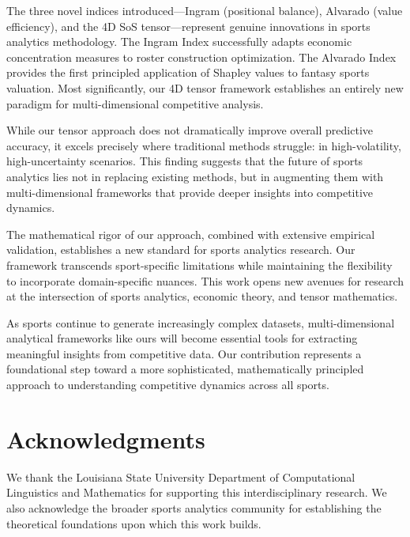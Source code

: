 \documentclass[11pt]{article}
\begin{document}
The three novel indices introduced—Ingram (positional balance), Alvarado (value efficiency), and the 4D SoS tensor—represent genuine innovations in sports analytics methodology. The Ingram Index successfully adapts economic concentration measures to roster construction optimization. The Alvarado Index provides the first principled application of Shapley values to fantasy sports valuation. Most significantly, our 4D tensor framework establishes an entirely new paradigm for multi-dimensional competitive analysis.

While our tensor approach does not dramatically improve overall predictive accuracy, it excels precisely where traditional methods struggle: in high-volatility, high-uncertainty scenarios. This finding suggests that the future of sports analytics lies not in replacing existing methods, but in augmenting them with multi-dimensional frameworks that provide deeper insights into competitive dynamics.

The mathematical rigor of our approach, combined with extensive empirical validation, establishes a new standard for sports analytics research. Our framework transcends sport-specific limitations while maintaining the flexibility to incorporate domain-specific nuances. This work opens new avenues for research at the intersection of sports analytics, economic theory, and tensor mathematics.

As sports continue to generate increasingly complex datasets, multi-dimensional analytical frameworks like ours will become essential tools for extracting meaningful insights from competitive data. Our contribution represents a foundational step toward a more sophisticated, mathematically principled approach to understanding competitive dynamics across all sports.

\section*{Acknowledgments}

We thank the Louisiana State University Department of Computational Linguistics and Mathematics for supporting this interdisciplinary research. We also acknowledge the broader sports analytics community for establishing the theoretical foundations upon which this work builds.
\end{document}
